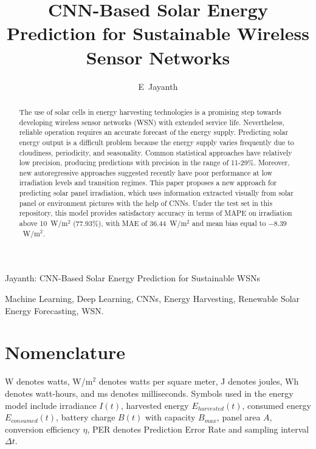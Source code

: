 \documentclass[journal]{IEEEtran}
\begin{document}
\title{ CNN-Based Solar Energy Prediction for Sustainable Wireless Sensor Networks}

\author{E~Jayanth%
}

%
{Jayanth: CNN-Based Solar Energy Prediction for Sustainable WSNs}

\maketitle

\begin{abstract}
The use of solar cells in energy harvesting technologies is a promising step towards developing wireless sensor networks (WSN) with extended service life. Nevertheless, reliable operation requires an accurate forecast of the energy supply. Predicting solar energy output is a difficult problem because the energy supply varies frequently due to cloudiness, periodicity, and seasonality. Common statistical approaches have relatively low precision, producing predictions with precision in the range of 11-29\%. Moreover, new autoregressive approaches suggested recently have poor performance at low irradiation levels and transition regimes. This paper proposes a new approach for predicting solar panel irradiation, which uses information extracted visually from solar panel or environment pictures with the help of CNNs. Under the test set in this repository, this model provides satisfactory accuracy in terms of MAPE on irradiation above 10~W/m$^2$ (77.93\%), with MAE of 36.44~W/m$^2$ and mean bias equal to $-8.39$~W/m$^2$.
\end{abstract}

\begin{IEEEkeywords}
Machine Learning, Deep Learning, CNNs, Energy Harvesting, Renewable Solar Energy Forecasting, WSN.
\end{IEEEkeywords}

\section*{Nomenclature}
W denotes watts, W/m$^2$ denotes watts per square meter, J denotes joules, Wh denotes watt-hours, and ms denotes milliseconds. Symbols used in the energy model include irradiance $I(t)$, harvested energy $E_{harvested}(t)$, consumed energy $E_{consumed}(t)$, battery charge $B(t)$ with capacity $B_{max}$, panel area $A$, conversion efficiency $\eta$, PER denotes Prediction Error Rate and sampling interval $\Delta t$.
\end{document}

